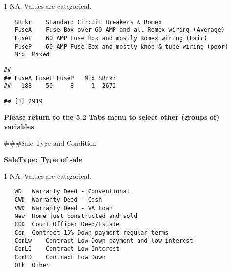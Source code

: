 \documentclass[]{article}
\newenvironment{Shaded}{\begin{snugshade}}{\end{snugshade}}
\newcommand{\CommentTok}[1]{\textcolor[rgb]{0.56,0.35,0.01}{\textit{#1}}}
\newcommand{\DecValTok}[1]{\textcolor[rgb]{0.00,0.00,0.81}{#1}}
\newcommand{\KeywordTok}[1]{\textcolor[rgb]{0.13,0.29,0.53}{\textbf{#1}}}
\newcommand{\NormalTok}[1]{#1}
\newcommand{\OperatorTok}[1]{\textcolor[rgb]{0.81,0.36,0.00}{\textbf{#1}}}
\newcommand{\StringTok}[1]{\textcolor[rgb]{0.31,0.60,0.02}{#1}}
\begin{document}
1 NA. Values are categorical.

\begin{verbatim}
   SBrkr    Standard Circuit Breakers & Romex
   FuseA    Fuse Box over 60 AMP and all Romex wiring (Average) 
   FuseF    60 AMP Fuse Box and mostly Romex wiring (Fair)
   FuseP    60 AMP Fuse Box and mostly knob & tube wiring (poor)
   Mix  Mixed
\end{verbatim}

\begin{Shaded}
\end{Shaded}

\begin{verbatim}
## 
## FuseA FuseF FuseP   Mix SBrkr 
##   188    50     8     1  2672
\end{verbatim}

\begin{Shaded}
\end{Shaded}

\begin{verbatim}
## [1] 2919
\end{verbatim}

\textbf{Please return to the 5.2 Tabs menu to select other (groups of)
variables}

\#\#\#Sale Type and Condition

\textbf{SaleType: Type of sale}

1 NA. Values are categorical.

\begin{verbatim}
   WD   Warranty Deed - Conventional
   CWD  Warranty Deed - Cash
   VWD  Warranty Deed - VA Loan
   New  Home just constructed and sold
   COD  Court Officer Deed/Estate
   Con  Contract 15% Down payment regular terms
   ConLw    Contract Low Down payment and low interest
   ConLI    Contract Low Interest
   ConLD    Contract Low Down
   Oth  Other
\end{verbatim}
\end{document}
